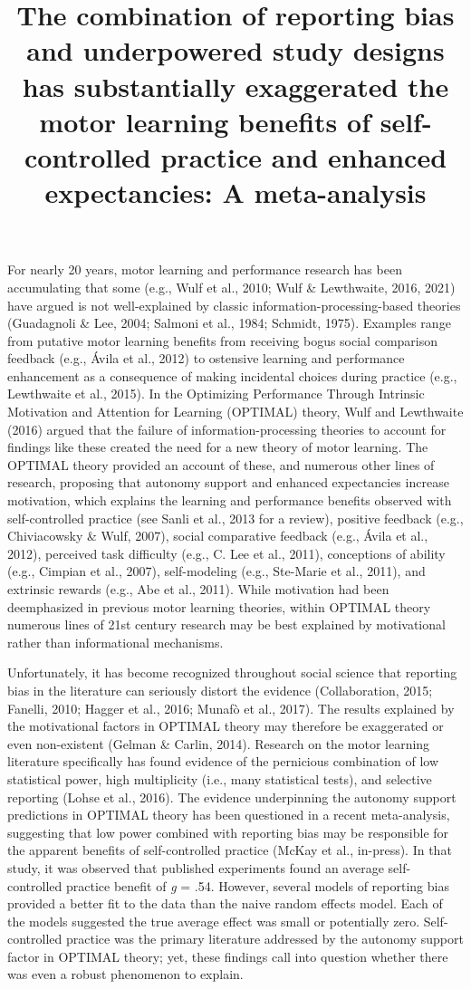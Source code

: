 \documentclass[
  man, donotrepeattitle,floatsintext]{apa7}
\title{The combination of reporting bias and underpowered study designs has substantially exaggerated the motor learning benefits of self-controlled practice and enhanced expectancies: A meta-analysis}
\author{\phantom{0}}
\date{}
\affiliation{\phantom{0}}
\begin{document}
\maketitle

For nearly 20 years, motor learning and performance research has been accumulating that some (e.g., Wulf et al., 2010; Wulf \& Lewthwaite, 2016, 2021) have argued is not well-explained by classic information-processing-based theories (Guadagnoli \& Lee, 2004; Salmoni et al., 1984; Schmidt, 1975). Examples range from putative motor learning benefits from receiving bogus social comparison feedback (e.g., Ávila et al., 2012) to ostensive learning and performance enhancement as a consequence of making incidental choices during practice (e.g., Lewthwaite et al., 2015). In the Optimizing Performance Through Intrinsic Motivation and Attention for Learning (OPTIMAL) theory, Wulf and Lewthwaite (2016) argued that the failure of information-processing theories to account for findings like these created the need for a new theory of motor learning. The OPTIMAL theory provided an account of these, and numerous other lines of research, proposing that autonomy support and enhanced expectancies increase motivation, which explains the learning and performance benefits observed with self-controlled practice (see Sanli et al., 2013 for a review), positive feedback (e.g., Chiviacowsky \& Wulf, 2007), social comparative feedback (e.g., Ávila et al., 2012), perceived task difficulty (e.g., C. Lee et al., 2011), conceptions of ability (e.g., Cimpian et al., 2007), self-modeling (e.g., Ste-Marie et al., 2011), and extrinsic rewards (e.g., Abe et al., 2011). While motivation had been deemphasized in previous motor learning theories, within OPTIMAL theory numerous lines of 21st century research may be best explained by motivational rather than informational mechanisms.

Unfortunately, it has become recognized throughout social science that reporting bias in the literature can seriously distort the evidence (Collaboration, 2015; Fanelli, 2010; Hagger et al., 2016; Munafò et al., 2017). The results explained by the motivational factors in OPTIMAL theory may therefore be exaggerated or even non-existent (Gelman \& Carlin, 2014). Research on the motor learning literature specifically has found evidence of the pernicious combination of low statistical power, high multiplicity (i.e., many statistical tests), and selective reporting (Lohse et al., 2016). The evidence underpinning the autonomy support predictions in OPTIMAL theory has been questioned in a recent meta-analysis, suggesting that low power combined with reporting bias may be responsible for the apparent benefits of self-controlled practice (McKay et al., in-press). In that study, it was observed that published experiments found an average self-controlled practice benefit of \emph{g} = .54. However, several models of reporting bias provided a better fit to the data than the naive random effects model. Each of the models suggested the true average effect was small or potentially zero. Self-controlled practice was the primary literature addressed by the autonomy support factor in OPTIMAL theory; yet, these findings call into question whether there was even a robust phenomenon to explain.
\end{document}
